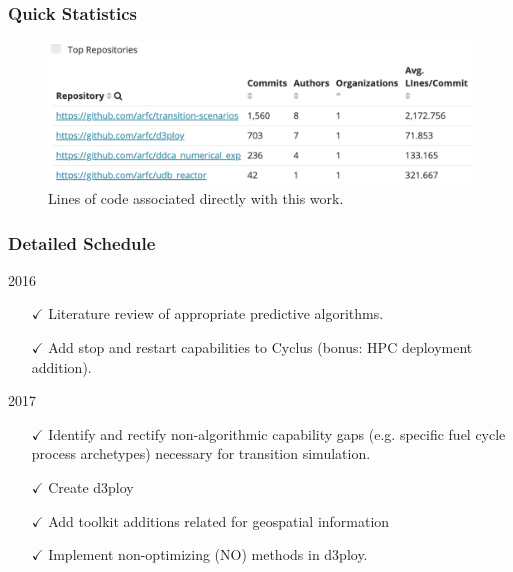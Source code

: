 \begin{frame}
        \frametitle{Quick Statistics}
    \begin{figure}[htbp!]
        \begin{center}
          \includegraphics[width=\textwidth]{images/git-stats-lines-ddca.png}
        \end{center}
              \caption{Lines of code associated directly with this work.}
      \end{figure}
\end{frame}


\begin{frame}
        \frametitle{Detailed Schedule}
\begin{block}{2016}
        \begin{itemize}
       \item[$\checkmark$] Literature review of appropriate predictive algorithms.
       \item[$\checkmark$] Add stop and restart capabilities to Cyclus (bonus: HPC deployment addition).
        \end{itemize}
\end{block}
\begin{block}{2017}
        \begin{itemize}
       \item[$\checkmark$] Identify and rectify non-algorithmic capability gaps (e.g. specific fuel cycle process archetypes) necessary for transition simulation.
       \item[$\checkmark$] Create d3ploy
       \item[$\checkmark$] Add toolkit additions related for geospatial information
       \item[$\checkmark$] Implement non-optimizing (NO) methods in d3ploy.
        \end{itemize}
\end{block}
\end{frame}


